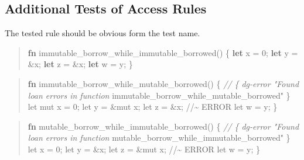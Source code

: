 \documentclass[
  11pt,
  twoside]{report}
\newenvironment{Shaded}{}{}
\newcommand{\CommentTok}[1]{\textit{#1}}
\newcommand{\DecValTok}[1]{#1}
\newcommand{\KeywordTok}[1]{\textbf{#1}}
\newcommand{\NormalTok}[1]{#1}
\newcommand{\OperatorTok}[1]{#1}
\newcommand{\StringTok}[1]{#1}
\begin{document}
\subsection{Additional Tests of Access
Rules}\label{sec:additional-tests-of-access-rules}

The tested rule should be obvious form the test name.

\begin{quote}
\begin{Shaded}
\begin{Highlighting}[]
\KeywordTok{fn}\NormalTok{ immutable\_borrow\_while\_immutable\_borrowed() }\OperatorTok{\{}
    \KeywordTok{let}\NormalTok{ x }\OperatorTok{=} \DecValTok{0}\OperatorTok{;}
    \KeywordTok{let}\NormalTok{ y }\OperatorTok{=} \OperatorTok{\&}\NormalTok{x}\OperatorTok{;}
    \KeywordTok{let}\NormalTok{ z }\OperatorTok{=} \OperatorTok{\&}\NormalTok{x}\OperatorTok{;}
    \KeywordTok{let}\NormalTok{ w }\OperatorTok{=}\NormalTok{ y}\OperatorTok{;}
\OperatorTok{\}}
\end{Highlighting}
\end{Shaded}
\end{quote}

\begin{quote}
\begin{Shaded}
\begin{Highlighting}[]
\KeywordTok{fn}\NormalTok{ immutable\_borrow\_while\_mutable\_borrowed() }\OperatorTok{\{}
    \CommentTok{// \{ dg{-}error "Found loan errors in function}
\NormalTok{         immutable\_borrow\_while\_mutable\_borrowed}\StringTok{" \}}
\StringTok{    let mut x = 0;}
\StringTok{    let y = \&mut x;}
\StringTok{    let z = \&x; //\textasciitilde{} ERROR}
\StringTok{    let w = y;}
\StringTok{\}}
\end{Highlighting}
\end{Shaded}
\end{quote}

\begin{quote}
\begin{Shaded}
\begin{Highlighting}[]
\KeywordTok{fn}\NormalTok{ mutable\_borrow\_while\_immutable\_borrowed() }\OperatorTok{\{}
    \CommentTok{// \{ dg{-}error "Found loan errors in function}
\NormalTok{         mutable\_borrow\_while\_immutable\_borrowed}\StringTok{" \}}
\StringTok{    let x = 0;}
\StringTok{    let y = \&x;}
\StringTok{    let z = \&mut x; //\textasciitilde{} ERROR}
\StringTok{    let w = y;}
\StringTok{\}}
\end{Highlighting}
\end{Shaded}
\end{quote}
\end{document}
